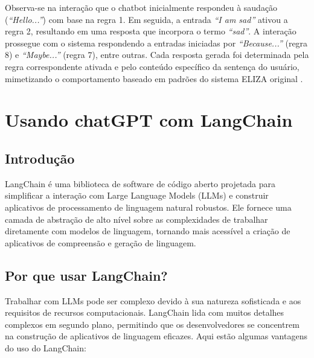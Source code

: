 \documentclass[14pt,a4paper,oneside]{book}
\begin{document}
Observa-se na interação que o chatbot inicialmente respondeu à saudação (\textit{``Hello...''}) com base na regra 1. Em seguida, a entrada \textit{``I am sad''} ativou a regra 2, resultando em uma resposta que incorpora o termo \textit{``sad''}. A interação prossegue com o sistema respondendo a entradas iniciadas por \textit{``Because...''} (regra 8) e \textit{``Maybe...''} (regra 7), entre outras. Cada resposta gerada foi determinada pela regra correspondente ativada e pelo conteúdo específico da sentença do usuário, mimetizando o comportamento baseado em padrões do sistema ELIZA original \cite{Abdul-Kader2015}.


\chapter{Usando chatGPT com LangChain}

\section{Introdução}

LangChain é uma biblioteca de software de código aberto projetada para simplificar a interação com Large Language Models (LLMs) e construir aplicativos de processamento de linguagem natural robustos. Ele fornece uma camada de abstração de alto nível sobre as complexidades de trabalhar diretamente com modelos de linguagem, tornando mais acessível a criação de aplicativos de compreensão e geração de linguagem.

\section{Por que usar LangChain?}

Trabalhar com LLMs pode ser complexo devido à sua natureza sofisticada e aos requisitos de recursos computacionais. LangChain lida com muitos detalhes complexos em segundo plano, permitindo que os desenvolvedores se concentrem na construção de aplicativos de linguagem eficazes. Aqui estão algumas vantagens do uso do LangChain:
\end{document}
